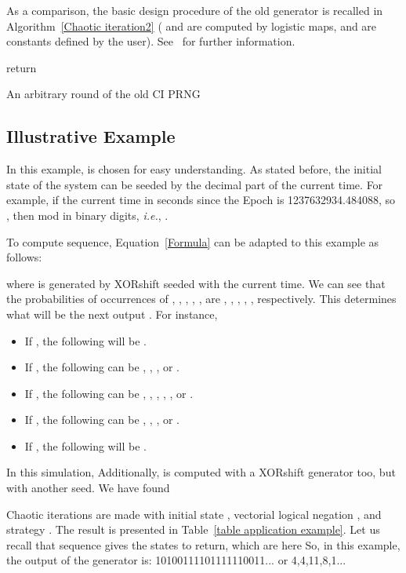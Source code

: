 \documentclass[journal]{IEEEtran}
\begin{document}
As a comparison, the basic design procedure of the old generator is recalled in Algorithm~\ref{Chaotic iteration2} ( and  are computed by logistic maps,  and  are constants defined by the user). See~\cite{wang2009} for further information.

\begin{algorithm}
\SetAlgoLined
{}
\;
\If{}
{

}
\Else
{

}

\;
\For{}
{
\;
\;
\;
}
\;
return \;
\medskip
\caption{An arbitrary round of the old CI PRNG}
\label{Chaotic iteration2}
\end{algorithm}



\subsection{Illustrative Example}

In this example,  is chosen for easy understanding.
As stated before, the initial state of the system  can be seeded by the decimal part  of the current time.
For example, if the current time in seconds since the Epoch is 1237632934.484088,
so , then mod in binary digits, \emph{i.e.}, .

To compute  sequence, Equation~\ref{Formula} can be adapted to this example as follows:


\noindent where  is generated by XORshift seeded with the current time. We can see that the probabilities of occurrences of , , , , , are , , , , , respectively. This  determines what will be the next output . For instance,
\begin{itemize}
\item If , the following  will be .
\item If , the following  can be , , , or .
\item If , the following  can be , , , , , or .
\item If , the following  can be , , , or .
\item If , the following  will be .
\end{itemize}

In this simulation,  Additionally,  is computed with a XORshift generator too, but with another seed. We have found 

Chaotic iterations are made with initial state , vectorial logical negation , and
strategy . The result is presented in Table~\ref{table application example}. Let us recall that sequence  gives the states  to return, which are here  So, in this example, the output of the generator is: 10100111101111110011... or 4,4,11,8,1...
\end{document}
